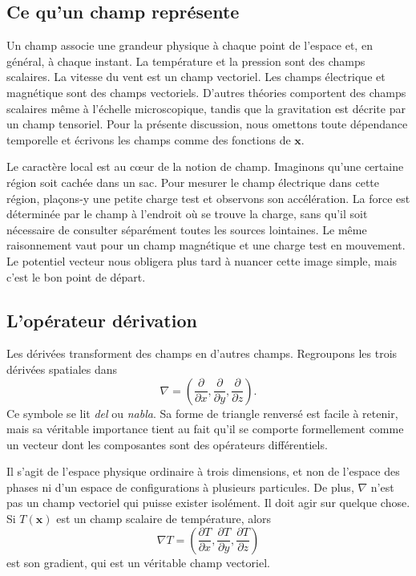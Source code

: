 \subsection{Ce qu’un champ représente}

Un champ associe une grandeur physique à chaque point de l’espace et, en général, à chaque instant. La température et la pression sont des champs scalaires. La vitesse du vent est un champ vectoriel. Les champs électrique et magnétique sont des champs vectoriels. D’autres théories comportent des champs scalaires même à l’échelle microscopique, tandis que la gravitation est décrite par un champ tensoriel. Pour la présente discussion, nous omettons toute dépendance temporelle et écrivons les champs comme des fonctions de \(\mathbf x\).

Le caractère local est au cœur de la notion de champ. Imaginons qu’une certaine région soit cachée dans un sac. Pour mesurer le champ électrique dans cette région, plaçons-y une petite charge test et observons son accélération. La force est déterminée par le champ à l’endroit où se trouve la charge, sans qu’il soit nécessaire de consulter séparément toutes les sources lointaines. Le même raisonnement vaut pour un champ magnétique et une charge test en mouvement. Le potentiel vecteur nous obligera plus tard à nuancer cette image simple, mais c’est le bon point de départ.

\subsection{L’opérateur dérivation}

Les dérivées transforment des champs en d’autres champs. Regroupons les trois dérivées spatiales dans
\begin{equation}
  \nabla
  =
  \left(
    \frac{\partial}{\partial x},
    \frac{\partial}{\partial y},
    \frac{\partial}{\partial z}
  \right).
\end{equation}
Ce symbole se lit \emph{del} ou \emph{nabla}. Sa forme de triangle renversé est facile à retenir, mais sa véritable importance tient au fait qu’il se comporte formellement comme un vecteur dont les composantes sont des opérateurs différentiels.

Il s’agit de l’espace physique ordinaire à trois dimensions, et non de l’espace des phases ni d’un espace de configurations à plusieurs particules. De plus, \(\nabla\) n’est pas un champ vectoriel qui puisse exister isolément. Il doit agir sur quelque chose. Si \(T(\mathbf x)\) est un champ scalaire de température, alors
\begin{equation}
  \nabla T
  =
  \left(
    \frac{\partial T}{\partial x},
    \frac{\partial T}{\partial y},
    \frac{\partial T}{\partial z}
  \right)
\end{equation}
est son gradient, qui est un véritable champ vectoriel.

